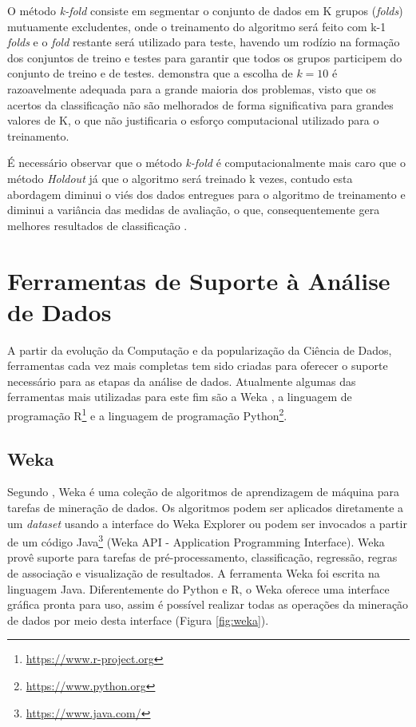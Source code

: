 O método \emph{k-fold} consiste em segmentar o conjunto de dados em K grupos (\emph{folds}) mutuamente excludentes, onde o treinamento do algoritmo será feito com k-1 \emph{folds} e o \emph{fold} restante será utilizado para teste, havendo um rodízio na formação dos conjuntos de treino e testes para garantir que todos os grupos participem do conjunto de treino e de testes.  demonstra que a escolha de $k = 10$ é razoavelmente adequada para a grande maioria dos problemas, visto que os acertos da classificação não são melhorados de forma significativa para grandes valores de K, o que não justificaria o esforço computacional utilizado para o treinamento.

É necessário observar que o método \emph{k-fold} é computacionalmente mais caro que o método \emph{Holdout} já que o algoritmo será treinado k vezes, contudo esta abordagem diminui o viés dos dados entregues para o algoritmo de treinamento e diminui a variância das medidas de avaliação, o que, consequentemente gera melhores resultados de classificação .


\section{Ferramentas de Suporte à Análise de Dados}

A partir da evolução da Computação e da popularização da Ciência de Dados, ferramentas cada vez mais completas tem sido criadas para oferecer o suporte necessário para as etapas da análise de dados. Atualmente algumas das ferramentas mais utilizadas para este fim são a Weka \cite{Hall2009}, a linguagem de programação R\footnote{\url{https://www.r-project.org}} e a linguagem de programação Python\footnote{\url{https://www.python.org}}.

\subsection{Weka}

Segundo , Weka é uma coleção de algoritmos de aprendizagem de máquina para tarefas de mineração de dados. Os algoritmos podem ser aplicados diretamente a um \textit{dataset} usando a interface do Weka Explorer ou podem ser invocados a partir de um código Java\footnote{\url{https://www.java.com/}} (Weka API - Application Programming Interface). Weka provê suporte para tarefas de  pré-processamento, classificação, regressão, regras de associação e visualização de resultados. A ferramenta Weka foi escrita na linguagem  Java. Diferentemente do Python e R, o Weka oferece uma interface gráfica pronta para uso, assim é possível realizar todas as operações da mineração de dados por meio desta interface (Figura \ref{fig:weka}).

